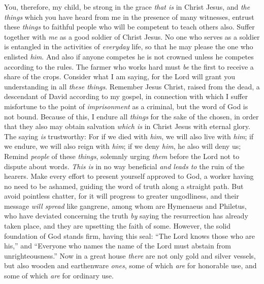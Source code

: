 \begin{biblechapter} %
 You, therefore, my child, be strong in the grace \textit{that is} in Christ Jesus,
\verse and \textit{the things} which you have heard from me in the presence of many witnesses, entrust these \textit{things} to faithful people who will be competent to teach others also.
\verse Suffer together with \textit{me} as a good soldier of Christ Jesus.
\verse No one who serves as a soldier is entangled in the activities of \textit{everyday} life, so that he may please the one who enlisted \textit{him}.
\verse And also if anyone competes he is not crowned unless he competes according to the rules.
\verse The farmer who works hard must \textit{be} the first to receive a share of the crops.
\verse Consider what I am saying, for the Lord will grant you understanding in all \textit{these things}.
 Remember Jesus Christ, raised from the dead, a descendant of David according to my gospel,
\verse in connection with which I suffer misfortune to the point of \textit{imprisonment} as a criminal, but the word of God is not bound.
\verse Because of this, I endure all \textit{things} for the sake of the chosen, in order that they also may obtain salvation \textit{which is} in Christ Jesus with eternal glory.
\verse The saying \textit{is} trustworthy:
\verse For if we died with \textit{him}, we will also live with \textit{him};
\verse if we endure, we will also reign with \textit{him}; 
if we deny \textit{him}, he also will deny us;
 Remind \textit{people} of these \textit{things}, solemnly urging \textit{them} before the Lord not to dispute about words. \textit{This is} in no way beneficial \textit{and leads to} the ruin of the hearers.
\verse Make every effort to present yourself approved to God, a worker having no need to be ashamed, guiding the word of truth along a straight path.
\verse But avoid pointless chatter, for it will progress to greater ungodliness,
\verse and their message \textit{will spread} like gangrene, among whom are Hymenaeus and Philetus,
\verse who have deviated concerning the truth \textit{by} saying the resurrection has already taken place, and they are upsetting the faith of some.
\verse However, the solid foundation of God stands firm, having this seal: “The Lord knows those who are his,” and “Everyone who names the name of the Lord must abstain from unrighteousness.”
\verse Now in a great house \textit{there} are not only gold and silver vessels, but also wooden and earthenware \textit{ones}, some of which \textit{are} for honorable use, and some of which \textit{are} for ordinary use.

\end{biblechapter}
